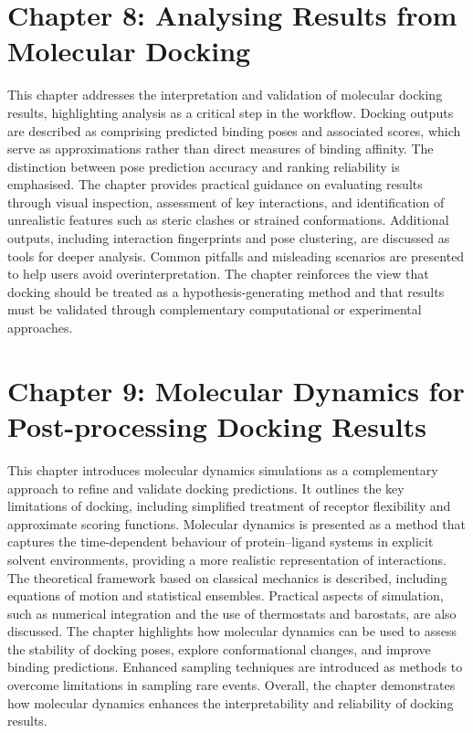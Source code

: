 \documentclass[12pt,a4paper]{article}
\begin{document}
\section*{Chapter 8: Analysing Results from Molecular Docking}
This chapter addresses the interpretation and validation of molecular docking results, highlighting analysis as a critical step in the workflow. Docking outputs are described as comprising predicted binding poses and associated scores, which serve as approximations rather than direct measures of binding affinity. The distinction between pose prediction accuracy and ranking reliability is emphasised. The chapter provides practical guidance on evaluating results through visual inspection, assessment of key interactions, and identification of unrealistic features such as steric clashes or strained conformations. Additional outputs, including interaction fingerprints and pose clustering, are discussed as tools for deeper analysis. Common pitfalls and misleading scenarios are presented to help users avoid overinterpretation. The chapter reinforces the view that docking should be treated as a hypothesis-generating method and that results must be validated through complementary computational or experimental approaches.

\section*{Chapter 9: Molecular Dynamics for Post-processing Docking Results}
This chapter introduces molecular dynamics simulations as a complementary approach to refine and validate docking predictions. It outlines the key limitations of docking, including simplified treatment of receptor flexibility and approximate scoring functions. Molecular dynamics is presented as a method that captures the time-dependent behaviour of protein–ligand systems in explicit solvent environments, providing a more realistic representation of interactions. The theoretical framework based on classical mechanics is described, including equations of motion and statistical ensembles. Practical aspects of simulation, such as numerical integration and the use of thermostats and barostats, are also discussed. The chapter highlights how molecular dynamics can be used to assess the stability of docking poses, explore conformational changes, and improve binding predictions. Enhanced sampling techniques are introduced as methods to overcome limitations in sampling rare events. Overall, the chapter demonstrates how molecular dynamics enhances the interpretability and reliability of docking results.
\end{document}
